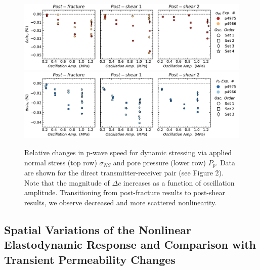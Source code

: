 \documentclass[letterpaper,10pt]{article}
\begin{document}
	\begin{figure}[ht]
		\centering
		\includegraphics[width=1\columnwidth]{delc_amp_NS}
		\includegraphics[width=1\columnwidth]{delc_amp_PP}
		\caption{ Relative changes in p-wave speed for dynamic stressing via applied normal stress (top row)  $ \sigma_{NS} $ and pore pressure (lower row) $ P_p $. Data are shown for the direct transmitter-receiver pair (see Figure 2). Note that the magnitude of $ \Delta c $  increases as a function of oscillation amplitude. Transitioning from post-fracture results to post-shear results, we observe decreased and more scattered nonlinearity.}%
		\label{fig:delc_ns_amp}
	\end{figure}
	
	\clearpage
	
	
	\subsection{Spatial Variations of the Nonlinear Elastodynamic Response and Comparison with Transient Permeability Changes}
\end{document}
